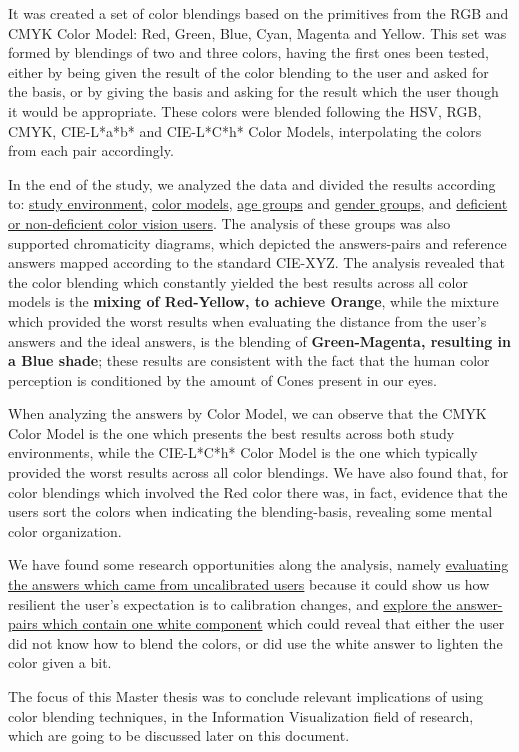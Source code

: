 %
It was created a set of color blendings based on the primitives from the RGB and CMYK Color Model: Red, Green, Blue,
Cyan, Magenta and Yellow. This set was formed by blendings of two and three colors, having the first ones been tested, either
by being given the result of the color blending to the user and asked for the basis, or by giving the basis and asking
for the result which the user though it would be appropriate. These colors were blended following the HSV, RGB, CMYK,
CIE-L*a*b* and CIE-L*C*h* Color Models, interpolating the colors from each pair accordingly. \par
%
In the end of the study, we analyzed the data and divided the results according to: \ul{study environment}, \ul{color
models}, \ul{age groups} and \ul{gender groups}, and \ul{deficient or non-deficient color vision users}. The analysis
of these groups was also supported chromaticity diagrams, which depicted the answers-pairs and reference answers
mapped according to the standard CIE-XYZ. The analysis revealed that the color blending which constantly yielded the
best results across all color models is the \textbf{mixing of Red-Yellow, to achieve Orange}, while the mixture which
provided the worst results when evaluating the distance from the user’s answers and the ideal answers, is the blending
of \textbf{Green-Magenta, resulting in a Blue shade}; these results are consistent with the fact that the human color
perception is conditioned by the amount of Cones present in our eyes. \par
%
When analyzing the answers by Color Model, we can observe that the CMYK Color Model is the one which presents the best
results across both study environments, while the CIE-L*C*h* Color Model is the one which typically provided the worst
results across all color blendings. We have also found that, for color blendings which involved the Red color there was,
in fact, evidence that the users sort the colors when indicating the blending-basis, revealing some mental color organization. \par
%
We have found some research opportunities along the analysis, namely \ul{evaluating the answers which came from
uncalibrated users} because it could show us how resilient the user's expectation is to calibration changes, and \ul{explore
the answer-pairs which contain one white component} which could reveal that either the user did not know how to blend
the colors, or did use the white answer to lighten the color given a bit. \par
%
The focus of this Master thesis was to conclude relevant implications of using color blending techniques, in the Information
Visualization field of research, which are going to be discussed later on this document.
%
